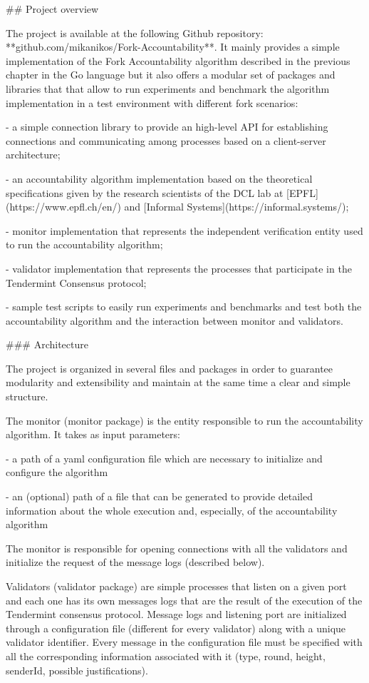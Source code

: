 \documentclass[a4paper,11pt,oneside]{report}
\begin{document}
\begin{markdown}

## Project overview

The project is available at the following Github repository: **github.com/mikanikos/Fork-Accountability**. It mainly provides a simple implementation of the Fork Accountability algorithm described in the previous chapter in the Go language but it also offers a modular set of packages and libraries that that allow to run experiments and benchmark the algorithm implementation in a test environment with different fork scenarios:

- a simple connection library to provide an high-level API for establishing connections and communicating among processes based on a client-server architecture; 

- an accountability algorithm implementation based on the theoretical specifications given by the research scientists of the DCL lab at [EPFL](https://www.epfl.ch/en/) and [Informal Systems](https://informal.systems/);  

- monitor implementation that represents the independent verification entity used to run the accountability algorithm;  

- validator implementation that represents the processes that participate in the Tendermint Consensus protocol; 

- sample test scripts to easily run experiments and benchmarks and test both the accountability algorithm and the interaction between monitor and validators.

### Architecture

The project is organized in several files and packages in order to guarantee modularity and extensibility and maintain at the same time a clear and simple structure.

The monitor (monitor package) is the entity responsible to run the accountability algorithm. It takes as input parameters:

- a path of a yaml configuration file which are necessary to initialize and configure the algorithm

- an (optional) path of a file that can be generated to provide detailed information about the whole execution and, especially, of the accountability algorithm

The monitor is responsible for opening connections with all the validators and initialize the request of the message logs (described below).

Validators (validator package) are simple processes that listen on a given port and each one has its own messages logs that are the result of the execution of the Tendermint consensus protocol. Message logs and listening port are initialized through a configuration file (different for every validator) along with a unique validator identifier.
Every message in the configuration file must be specified with all the corresponding information associated with it (type, round, height, senderId, possible justifications).


\end{markdown}
\end{document}
